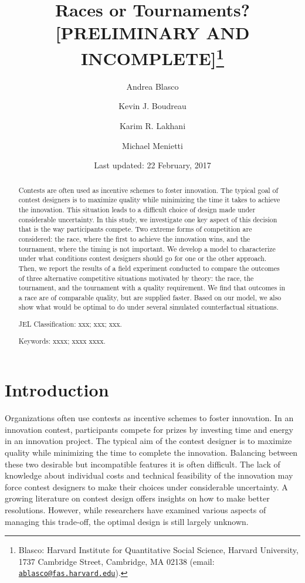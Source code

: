 \documentclass[12pt,]{article}
\title{Races or Tournaments? {[}PRELIMINARY AND INCOMPLETE{]}\thanks{Blasco: Harvard Institute for Quantitative Social Science, Harvard
University, 1737 Cambridge Street, Cambridge, MA 02138 (email:
\href{mailto:ablasco@fas.harvard.edu}{\nolinkurl{ablasco@fas.harvard.edu}}).}}
\author{Andrea Blasco \and Kevin J. Boudreau \and Karim R. Lakhani \and Michael Menietti}
\date{Last updated: 22 February, 2017}
\begin{document}
\maketitle
\begin{abstract}
Contests are often used as incentive schemes to foster innovation. The
typical goal of contest designers is to maximize quality while
minimizing the time it takes to achieve the innovation. This situation
leads to a difficult choice of design made under considerable
uncertainty. In this study, we investigate one key aspect of this
decision that is the way participants compete. Two extreme forms of
competition are considered: the race, where the first to achieve the
innovation wins, and the tournament, where the timing is not important.
We develop a model to characterize under what conditions contest
designers should go for one or the other approach. Then, we report the
results of a field experiment conducted to compare the outcomes of three
alternative competitive situations motivated by theory: the race, the
tournament, and the tournament with a quality requirement. We find that
outcomes in a race are of comparable quality, but are supplied faster.
Based on our model, we also show what would be optimal to do under
several simulated counterfactual situations.

\smallskip\noindent 
JEL Classification: xxx; xxx; xxx.

\smallskip\noindent 
Keywords: xxxx; xxxx xxxx.
\end{abstract}


\clearpage
\tableofcontents
\setcounter{tocdepth}{2}
\clearpage

\section{Introduction}\label{introduction}

Organizations often use contests as incentive schemes to foster
innovation. In an innovation contest, participants compete for prizes by
investing time and energy in an innovation project. The typical aim of
the contest designer is to maximize quality while minimizing the time to
complete the innovation. Balancing between these two desirable but
incompatible features it is often difficult. The lack of knowledge about
individual costs and technical feasibility of the innovation may force
contest designers to make their choices under considerable uncertainty.
A growing literature on contest design offers insights on how to make
better resolutions. However, while researchers have examined various
aspects of managing this trade-off, the optimal design is still largely
unknown.
\end{document}
